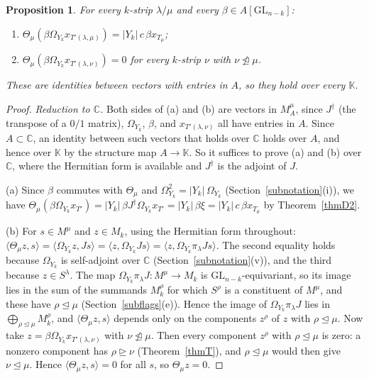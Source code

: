 \documentclass[11pt, letterpaper]{amsart}
\newtheorem{proposition}{Proposition}
\theoremstyle{definition}
\theoremstyle{remark}
\newcommand{\KK}{\mathbb{K}}
\newcommand{\CC}{\mathbb{C}}
\newcommand{\GL}{\mathrm{GL}}
\newcommand{\domeq}{\trianglelefteq}
\begin{document}
\begin{proposition}\label{propids}
For every $k$-strip $\lambda/\mu$ and every $\beta\in A[\GL_{n-k}]$:
\begin{enumerate}
\item[(a)] $\Theta_\mu(\beta \Omega_{Y_k}x_{T'(\lambda,\mu)})=|Y_k|\,c\,\beta x_{T_\mu}$;
\item[(b)] $\Theta_\mu(\beta \Omega_{Y_k}x_{T'(\lambda,\nu)})=0$ for every $k$-strip $\nu$ with $\nu\not\domeq\mu$.
\end{enumerate}
These are identities between vectors with entries in $A$, so they hold over every $\KK$.
\end{proposition}
\begin{proof}
\emph{Reduction to $\CC$.} Both sides of (a) and (b) are vectors in $M^\mu_A$, since $J^\dagger$ (the transpose of a $0/1$ matrix), $\Omega_{Y_k}$, $\beta$, and $x_{T'(\lambda,\nu)}$ all have entries in $A$. Since $A\subset\CC$, an identity between such vectors that holds over $\CC$ holds over $A$, and hence over $\KK$ by the structure map $A\to\KK$. So it suffices to prove (a) and (b) over $\CC$, where the Hermitian form is available and $J^\dagger$ is the adjoint of $J$.

(a) Since $\beta$ commutes with $\Theta_\mu$ and $\Omega_{Y_k}^2=|Y_k|\,\Omega_{Y_k}$ (Section~\ref{subnotation}(i)), we have $\Theta_\mu(\beta \Omega_{Y_k}x_{T'})=|Y_k|\,\beta J^\dagger\Omega_{Y_k}x_{T'}=|Y_k|\,\beta\xi=|Y_k|\,c\,\beta x_{T_\mu}$ by Theorem~\ref{thmD2}.

(b) For $s\in M^\mu$ and $z\in M_k$, using the Hermitian form throughout: $\langle\Theta_\mu z,s\rangle=\langle \Omega_{Y_k}z,Js\rangle=\langle z,\Omega_{Y_k}Js\rangle=\langle z,\Omega_{Y_k}\pi_\lambda Js\rangle$. The second equality holds because $\Omega_{Y_k}$ is self-adjoint over $\CC$ (Section~\ref{subnotation}(v)), and the third because $z\in S^\lambda$. The map $\Omega_{Y_k}\pi_\lambda J\colon M^\mu\to M_k$ is $\GL_{n-k}$-equivariant, so its image lies in the sum of the summands $M_k^\rho$ for which $S^\rho$ is a constituent of $M^\mu$, and these have $\rho\domeq\mu$ (Section~\ref{subflags}(e)). Hence the image of $\Omega_{Y_k}\pi_\lambda J$ lies in $\bigoplus_{\rho\domeq\mu}M_k^\rho$, and $\langle\Theta_\mu z,s\rangle$ depends only on the components $z^\rho$ of $z$ with $\rho\domeq\mu$. Now take $z=\beta \Omega_{Y_k}x_{T'(\lambda,\nu)}$ with $\nu\not\domeq\mu$. Then every component $z^\rho$ with $\rho\domeq\mu$ is zero: a nonzero component has $\rho\trianglerighteq\nu$ (Theorem~\ref{thmT}), and $\rho\domeq\mu$ would then give $\nu\domeq\mu$. Hence $\langle\Theta_\mu z,s\rangle=0$ for all $s$, so $\Theta_\mu z=0$.
\end{proof}
\end{document}
